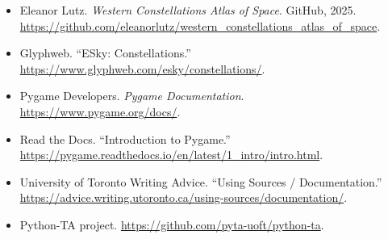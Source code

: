 \documentclass[11pt]{article}
\begin{document}
\begin{itemize}
  \item Eleanor Lutz. \emph{Western Constellations Atlas of Space}. GitHub, 2025. \url{https://github.com/eleanorlutz/western_constellations_atlas_of_space}.
  \item Glyphweb. ``ESky: Constellations.'' \url{https://www.glyphweb.com/esky/constellations/}.
  \item Pygame Developers. \emph{Pygame Documentation}. \url{https://www.pygame.org/docs/}.
  \item Read the Docs. ``Introduction to Pygame.'' \url{https://pygame.readthedocs.io/en/latest/1_intro/intro.html}.
  \item University of Toronto Writing Advice. ``Using Sources / Documentation.'' \url{https://advice.writing.utoronto.ca/using-sources/documentation/}.
  \item Python-TA project. \url{https://github.com/pyta-uoft/python-ta}.
\end{itemize}
\end{document}

